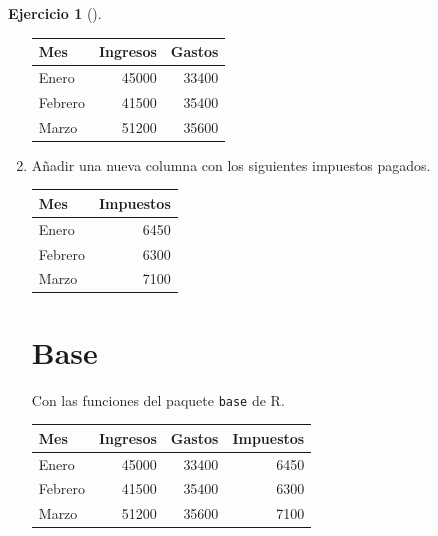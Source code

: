 \documentclass[
  a4paper,
]{scrreport}
\newenvironment{Shaded}{\begin{snugshade}}{\end{snugshade}}
\newcommand{\DecValTok}[1]{\textcolor[rgb]{0.68,0.00,0.00}{#1}}
\newcommand{\FunctionTok}[1]{\textcolor[rgb]{0.28,0.35,0.67}{#1}}
\newcommand{\NormalTok}[1]{\textcolor[rgb]{0.00,0.23,0.31}{#1}}
\newcommand{\OtherTok}[1]{\textcolor[rgb]{0.00,0.23,0.31}{#1}}
\newcommand{\SpecialCharTok}[1]{\textcolor[rgb]{0.37,0.37,0.37}{#1}}
\theoremstyle{definition}
\newtheorem{exercise}{Ejercicio}[chapter]
\theoremstyle{remark}
\begin{document}
\begin{exercise}[]
\begin{enumerate}
\begin{tcolorbox}
  \begin{longtable}[]{@{}lrr@{}}
  \toprule\noalign{}
  Mes & Ingresos & Gastos \\
  \midrule\noalign{}
  \endhead
  \bottomrule\noalign{}
  \endlastfoot
  Enero & 45000 & 33400 \\
  Febrero & 41500 & 35400 \\
  Marzo & 51200 & 35600 \\
  \end{longtable}

  \end{tcolorbox}
\item
  Añadir una nueva columna con los siguientes impuestos pagados.

  \begin{longtable}[]{@{}lr@{}}
  \toprule\noalign{}
  Mes & Impuestos \\
  \midrule\noalign{}
  \endhead
  \bottomrule\noalign{}
  \endlastfoot
  Enero & 6450 \\
  Febrero & 6300 \\
  Marzo & 7100 \\
  \end{longtable}

  \begin{tcolorbox}[enhanced jigsaw, colframe=quarto-callout-tip-color-frame, toprule=.15mm, bottomtitle=1mm, breakable, opacitybacktitle=0.6, toptitle=1mm, colback=white, bottomrule=.15mm, title=\textcolor{quarto-callout-tip-color}{\faLightbulb}\hspace{0.5em}{Solución}, arc=.35mm, left=2mm, titlerule=0mm, rightrule=.15mm, coltitle=black, leftrule=.75mm, opacityback=0, colbacktitle=quarto-callout-tip-color!10!white]

  \section{Base}

  Con las funciones del paquete \texttt{base} de R.

\begin{Shaded}
\end{Shaded}

  \begin{longtable}[]{@{}lrrr@{}}
  \toprule\noalign{}
  Mes & Ingresos & Gastos & Impuestos \\
  \midrule\noalign{}
  \endhead
  \bottomrule\noalign{}
  \endlastfoot
  Enero & 45000 & 33400 & 6450 \\
  Febrero & 41500 & 35400 & 6300 \\
  Marzo & 51200 & 35600 & 7100 \\
  \end{longtable}


\end{tcolorbox}
\end{enumerate}
\end{exercise}
\end{document}
